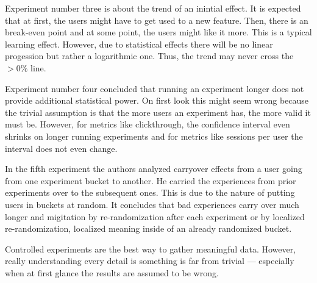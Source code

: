\documentclass[a4paper,12pt,english]{scrartcl}
\begin{document}
Experiment number three is about the trend of an inintial effect. It is expected that at first, the users might have to get used to a new feature. Then, there is an break-even point and at some point, the users might like it more. This is a typical learning effect. However, due to statistical effects there will be no linear progession but rather a logarithmic one. Thus, the trend may never cross the $> 0\%$ line.

Experiment number four concluded that running an experiment longer does not provide additional statistical power. On first look this might seem wrong because the trivial assumption is that the more users an experiment has, the more valid it must be. However, for metrics like clickthrough, the confidence interval even shrinks on longer running experiments and for metrics like sessions per user the interval does not even change.

In the fifth experiment the authors analyzed carryover effects from a user going from one experiment bucket to another. He carried the experiences from prior experiments over to the subsequent ones. This is due to the nature of putting users in buckets at random. It concludes that bad experiences carry over much longer and migitation by re-randomization after each experiment or by localized re-randomization, localized meaning inside of an already randomized bucket.

Controlled experiments are the best way to gather meaningful data. However, really understanding every detail is something is far from trivial --- especially when at first glance the results are assumed to be wrong.
\end{document}
